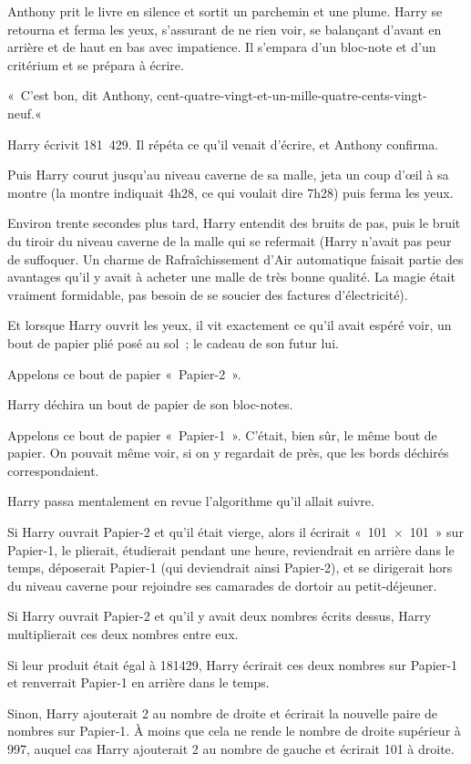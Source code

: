Anthony prit le livre en silence et sortit un parchemin et une plume. Harry se retourna et ferma les yeux, s'assurant de ne rien voir, se balançant d'avant en arrière et de haut en bas avec impatience. Il s'empara d'un bloc-note et d'un critérium et se prépara à écrire.

«~C'est bon, dit Anthony, cent-quatre-vingt-et-un-mille-quatre-cents-vingt-neuf.«~

Harry écrivit 181~429. Il répéta ce qu'il venait d'écrire, et Anthony confirma.

Puis Harry courut jusqu'au niveau caverne de sa malle, jeta un coup d'œil à sa montre (la montre indiquait 4h28, ce qui voulait dire 7h28) puis ferma les yeux.

Environ trente secondes plus tard, Harry entendit des bruits de pas, puis le bruit du tiroir du niveau caverne de la malle qui se refermait (Harry n'avait pas peur de suffoquer. Un charme de Rafraîchissement d'Air automatique faisait partie des avantages qu'il y avait à acheter une malle de très bonne qualité. La magie était vraiment formidable, pas besoin de se soucier des factures d'électricité).

Et lorsque Harry ouvrit les yeux, il vit exactement ce qu'il avait espéré voir, un bout de papier plié posé au sol~; le cadeau de son futur lui.

Appelons ce bout de papier «~Papier-2~».

Harry déchira un bout de papier de son bloc-notes.

Appelons ce bout de papier «~Papier-1~». C'était, bien sûr, le même bout de papier. On pouvait même voir, si on y regardait de près, que les bords déchirés correspondaient.

Harry passa mentalement en revue l'algorithme qu'il allait suivre.

Si Harry ouvrait Papier-2 et qu'il était vierge, alors il écrirait «~101~$\times$~101~» sur Papier-1, le plierait, étudierait pendant une heure, reviendrait en arrière dans le temps, déposerait Papier-1 (qui deviendrait ainsi Papier-2), et se dirigerait hors du niveau caverne pour rejoindre ses camarades de dortoir au petit-déjeuner.

Si Harry ouvrait Papier-2 et qu'il y avait deux nombres écrits dessus, Harry multiplierait ces deux nombres entre eux.

Si leur produit était égal à 181429, Harry écrirait ces deux nombres sur Papier-1 et renverrait Papier-1 en arrière dans le temps.

Sinon, Harry ajouterait 2 au nombre de droite et écrirait la nouvelle paire de nombres sur Papier-1. À moins que cela ne rende le nombre de droite supérieur à 997, auquel cas Harry ajouterait 2 au nombre de gauche et écrirait 101 à droite.

